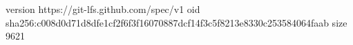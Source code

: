 version https://git-lfs.github.com/spec/v1
oid sha256:c008d0d71d8dfe1cf2f6f3f16070887dcf14f3c5f8213e8330c253584064faab
size 9621
